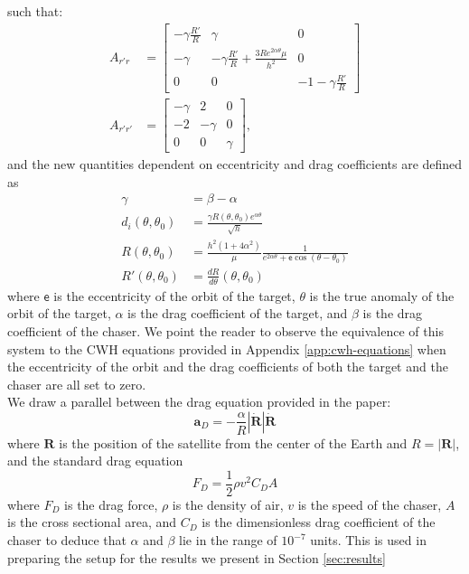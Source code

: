 such that:
\begin{subequations}
\begin{align}
    A_{r'r}&=\begin{bmatrix}
        -\gamma\frac{R'}{R}&\gamma&0\\
        -\gamma&-\gamma\frac{R'}{R} + \frac{3Re^{2\alpha\theta}\mu}{h^2}&0\\
        0&0&-1-\gamma\frac{R'}{R}
    \end{bmatrix}\\
    A_{r'r'}&=\begin{bmatrix}
        -\gamma&2&0\\
        -2&-\gamma&0\\
        0&0&\gamma
    \end{bmatrix},
\end{align}
\end{subequations}
and the new quantities dependent on eccentricity and drag coefficients are defined as
\begin{subequations}
\begin{align}
    \gamma&= \beta - \alpha\\
    d_i(\theta,\theta_0) &= \frac{\gamma R(\theta,\theta_0)e^{\alpha\theta}}{\sqrt{h}}\\
    R(\theta,\theta_0) &= \frac{h^2(1+4\alpha^2)}{\mu} \frac{1}{e^{2\alpha\theta} + {\mathsf{e}}\cos{(\theta - \theta_0)}}\\
    R'(\theta,\theta_0)&=\frac{dR}{d\theta}(\theta,\theta_0)
\end{align}
\end{subequations}
where ${\mathsf{e}}$ is the eccentricity of the orbit of the target, $\theta$ is the true anomaly of the orbit of the target, $\alpha$ is the drag coefficient of the target, and $\beta$ is the drag coefficient of the chaser.
We point the reader to observe the equivalence of this system to the CWH equations provided in Appendix \ref{app:cwh-equations} when the eccentricity of the orbit and the drag coefficients of both the target and the chaser are all set to zero.\\
We draw a parallel between the drag equation provided in the paper:
\begin{equation}
    \boldsymbol{a}_{D}=-\frac{\alpha}{R}|\dot{\boldsymbol{R}}|\dot{\boldsymbol{R}}
\end{equation}
where $\boldsymbol{R}$ is the position of the satellite from the center of the Earth and $R=|\boldsymbol{R}|$, and the standard drag equation \cite{batchelor2000an}
\begin{equation}
    F_{D}=\frac{1}{2}\rho v^{2}C_{D}A
\end{equation}
where $F_{D}$ is the drag force, $\rho$ is the density of air, $v$ is the speed of the chaser, $A$ is the cross sectional area, and $C_{D}$ is the dimensionless drag coefficient of the chaser to deduce that $\alpha$ and $\beta$ lie in the range of $10^{-7}$ units.
This is used in preparing the setup for the results we present in Section \ref{sec:results}

